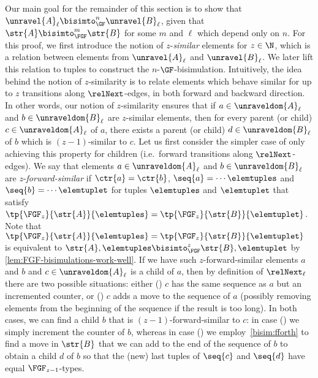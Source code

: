 Our main goal for the remainder of this section is to show that $\unravel{A}_{\ell} \bisimto_{\GF}^{n} \unravel{B}_{\ell}$, given that $\str{A} \bisimto_{\FGF}^{m} \str{B}$ for some $m$ and $\ell$ which depend only on $n$.
For this proof, we first introduce the notion of $z$-\emph{similar} elements for $z \in \N$, which is a relation between elements from $\unravel{A}_{\ell}$ and $\unravel{B}_{\ell}$.
We later lift this relation to tuples to construct the $n$-$\GF$-bisimulation.
Intuitively, the idea behind the notion of $z$-similarity is to relate elements which behave similar for up to $z$ transitions along $\relNext$-edges, in both forward and backward direction.
In other words, our notion of $z$-similarity ensures that if $a \in \unraveldom{A}_{\ell}$ and $b \in \unraveldom{B}_{\ell}$ are $z$-similar elements, then for every parent (or child) $c \in \unraveldom{A}_{\ell}$ of $a$, there exists a parent (or child) $d \in \unraveldom{B}_{\ell}$ of $b$ which is $(z{-}1)$-similar to $c$.
Let us first consider the simpler case of only achieving this property for children (i.e.\ forward transitions along $\relNext$-edges).
We say that elements $a \in \unraveldom{A}_{\ell}$ and $b \in \unraveldom{B}_{\ell}$ are $z$-\emph{forward-similar} if $\ctr{a} = \ctr{b}$, $\seq{a} = \cdots \elemtuples$ and $\seq{b} = \cdots \elemtuplet$ for tuples $\elemtuples$ and $\elemtuplet$ that satisfy $\tp{\FGF_{z}}{\str{A}}{\elemtuples} = \tp{\FGF_{z}}{\str{B}}{\elemtuplet}$.
Note that $\tp{\FGF_{z}}{\str{A}}{\elemtuples} = \tp{\FGF_{z}}{\str{B}}{\elemtuplet}$ is equivalent to $\str{A}, \elemtuples \bisimto_{\FGF}^{z} \str{B}, \elemtuplet$ by \cref{lem:FGF-bisimulations-work-well}.
If we have such $z$-forward-similar elements $a$ and $b$ and $c \in \unraveldom{A}_{\ell}$ is a child of $a$, then by definition of $\relNext_{\ell}$ there are two possible situations: either () $c$ has the same sequence as $a$ but an incremented counter, or () $c$ adds a move to the sequence of $a$ (possibly removing elements from the beginning of the sequence if the result is too long).
In both cases, we can find a child $b$ that is $(z{-}1)$-forward-similar to $c$: in case () we simply increment the counter of $b$, whereas in case () we employ~\ref{bisim:fforth} to find a move in $\str{B}$ that we can add to the end of the sequence of $b$ to obtain a child $d$ of $b$ so that the (new) last tuples of $\seq{c}$ and $\seq{d}$ have equal $\FGF_{z{-}1}$-types.

